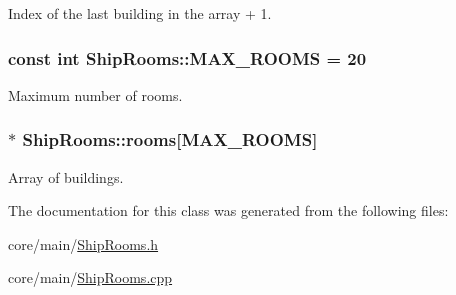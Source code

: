 Index of the last building in the array + 1. 

\hypertarget{classShipRooms_a4c6a08678ec28bde999016e8980b7493}{
\subsubsection[{M\-A\-X\-\_\-\-R\-O\-O\-M\-S}]{\setlength{\rightskip}{0pt plus 5cm}const int Ship\-Rooms\-::\-M\-A\-X\-\_\-\-R\-O\-O\-M\-S = 20\hspace{0.3cm}{\ttfamily [static]}}}\label{classShipRooms_a4c6a08678ec28bde999016e8980b7493}


Maximum number of rooms. 

\hypertarget{classShipRooms_a52ced61edb73b269c13ad86c37d58678}{
\subsubsection[{rooms}]{$\ast$ Ship\-Rooms\-::rooms\mbox{[}{\bf M\-A\-X\-\_\-\-R\-O\-O\-M\-S}\mbox{]}}}\label{classShipRooms_a52ced61edb73b269c13ad86c37d58678}


Array of buildings. 



The documentation for this class was generated from the following files\-:\begin{DoxyCompactItemize}
\item 
core/main/\hyperlink{ShipRooms_8h}{Ship\-Rooms.\-h}\item 
core/main/\hyperlink{ShipRooms_8cpp}{Ship\-Rooms.\-cpp}\end{DoxyCompactItemize}
